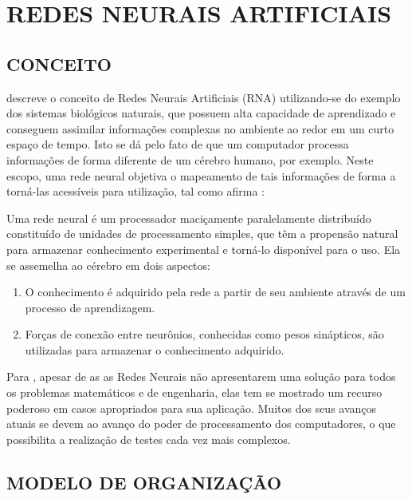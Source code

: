 

\section{REDES NEURAIS ARTIFICIAIS}

\subsection{CONCEITO}

 descreve o conceito de Redes Neurais Artificiais (RNA) utilizando-se do exemplo dos sistemas biológicos naturais, que possuem alta capacidade de aprendizado e conseguem assimilar informações complexas no ambiente ao redor em um curto espaço de tempo. Isto se dá pelo fato de que um computador processa informações de forma diferente de um cérebro humano, por exemplo. Neste escopo, uma rede neural objetiva o mapeamento de tais informações de forma a torná-las acessíveis para utilização, tal como afirma :

\begin{citacao}
	Uma rede neural é um processador maciçamente paralelamente distribuído constituído de unidades de processamento simples, que têm a propensão natural para armazenar conhecimento experimental e torná-lo disponível para o uso. Ela se assemelha ao cérebro em dois aspectos:
	\begin{enumerate}[leftmargin=4.7cm, topsep=0cm]
	    \item O conhecimento é adquirido pela rede a partir de seu ambiente através de um processo de aprendizagem.
	    \item Forças de conexão entre neurônios, conhecidas como pesos sinápticos, são utilizadas para armazenar o conhecimento adquirido.
	\end{enumerate}
\end{citacao}

Para , apesar de as as Redes Neurais não apresentarem uma solução para todos os problemas matemáticos e de engenharia, elas tem se mostrado um recurso poderoso em casos apropriados para sua aplicação. Muitos dos seus avanços atuais se devem ao avanço do poder de processamento dos computadores, o que possibilita a realização de testes cada vez mais complexos.

\subsection{MODELO DE ORGANIZAÇÃO}

